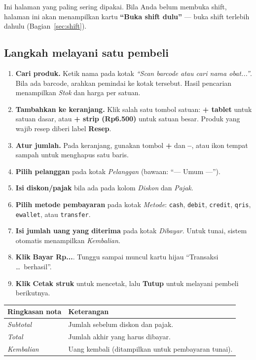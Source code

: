 \documentclass[11pt,a4paper]{article}
\newcommand{\btn}[1]{\textcolor{primary}{\textbf{#1}}}
\newcommand{\field}[1]{\textit{#1}}
\newcommand{\code}[1]{\texttt{\small #1}}
\begin{document}
Ini halaman yang paling sering dipakai. Bila Anda belum membuka shift, halaman
ini akan menampilkan kartu \textbf{``Buka shift dulu''} --- buka shift terlebih
dahulu (Bagian~\ref{sec:shift}).

\subsection{Langkah melayani satu pembeli}

\begin{enumerate}[leftmargin=1.5em,itemsep=0.4em]
  \item \textbf{Cari produk.} Ketik nama pada kotak
        \field{``Scan barcode atau cari nama obat...''}. Bila ada barcode,
        arahkan pemindai ke kotak tersebut. Hasil pencarian menampilkan
        \field{Stok} dan harga per satuan.
  \item \textbf{Tambahkan ke keranjang.} Klik salah satu tombol satuan:
        \btn{+ tablet} untuk satuan dasar, atau \btn{+ strip (Rp6.500)} untuk
        satuan besar. Produk yang wajib resep diberi label \textbf{Resep}.
  \item \textbf{Atur jumlah.} Pada keranjang, gunakan tombol \textbf{+} dan
        \textbf{--}, atau ikon tempat sampah untuk menghapus satu baris.
  \item \textbf{Pilih pelanggan} pada kotak \field{Pelanggan} (bawaan:
        ``--- Umum ---'').
  \item \textbf{Isi diskon/pajak} bila ada pada kolom \field{Diskon} dan
        \field{Pajak}.
  \item \textbf{Pilih metode pembayaran} pada kotak \field{Metode}:
        \code{cash}, \code{debit}, \code{credit}, \code{qris},
        \code{ewallet}, atau \code{transfer}.
  \item \textbf{Isi jumlah uang yang diterima} pada kotak \field{Dibayar}.
        Untuk tunai, sistem otomatis menampilkan \field{Kembalian}.
  \item \textbf{Klik} \btn{Bayar Rp...}. Tunggu sampai muncul kartu hijau
        ``Transaksi \dots\ berhasil''.
  \item \textbf{Klik} \btn{Cetak struk} untuk mencetak, lalu \btn{Tutup} untuk
        melayani pembeli berikutnya.
\end{enumerate}

\begin{tabularx}{\textwidth}{@{}L{3.4cm}Y@{}}
  \toprule
  \textbf{Ringkasan nota} & \textbf{Keterangan} \\
  \midrule
  \field{Subtotal}  & Jumlah sebelum diskon dan pajak. \\
  \field{Total}     & Jumlah akhir yang harus dibayar. \\
  \field{Kembalian} & Uang kembali (ditampilkan untuk pembayaran tunai). \\
  \bottomrule
\end{tabularx}
\end{document}
